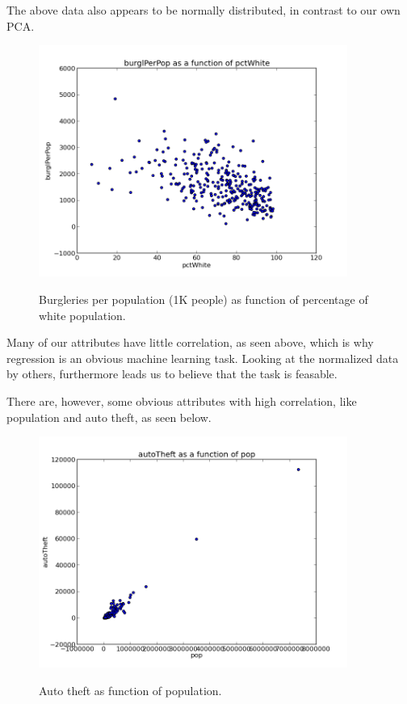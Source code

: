 The above data also appears to be normally distributed, in contrast to our own PCA.

\begin{figure}[H]
\centering
\includegraphics[width=0.9\textwidth]{correlations/burglPerPop-as-func-of-pctWhite.png}
\label{fig:prenorm_attrrem_0out}
\caption{Burgleries per population (1K people) as function of percentage of white population.}
\end{figure}

Many of our attributes have little correlation, as seen above, which is why regression is an obvious machine learning task. Looking at the normalized data by others, furthermore leads us to believe that the task is feasable.

There are, however, some obvious attributes with high correlation, like population and auto theft, as seen below.

\begin{figure}[H]
\centering
\includegraphics[width=0.9\textwidth]{correlations/autoTheft-as-func-of-pop}
\label{fig:prenorm_attrrem_0out}
\caption{Auto theft as function of population.}
\end{figure}
